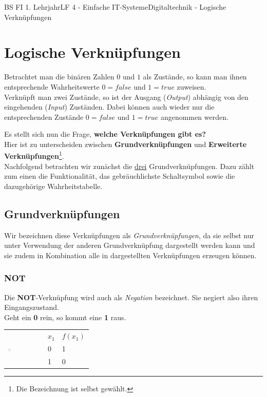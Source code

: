 \documentclass[11pt,twocolumn,oneside,openany,headings=optiontotoc,11pt,numbers=noenddot]{article}
\begin{document}
	\begin{worksheet}{BS FI 1. Lehrjahr}{LF 4 - Einfache IT-Systeme}{Digitaltechnik - Logische Verknüpfungen}
		\setcounter{section}{1}
		\setcounter{page}{5}
		\section{Logische Verknüpfungen}
		Betrachtet man die binären Zahlen \(0\) und \(1\) als Zustände, so kann man ihnen entsprechende Wahrheitswerte \(0 = false\) und \(1 = true\) zuweisen.\\
		Verknüpft man zwei Zustände, so ist der Ausgang (\textit{Output}) abhängig von den eingehenden (\textit{Input}) Zuständen. Dabei können auch wieder nur die entsprechenden Zustände \(0 = false\) und \(1 = true\) angenommen werden.\\
		\par\noindent
		Es stellt sich nun die Frage, \textbf{welche Verknüpfungen gibt es?}\\
		Hier ist zu unterscheiden zwischen \textbf{Grundverknüpfungen} und \textbf{Erweiterte Verknüpfungen}\footnote{Die Bezeichnung ist selbst gewählt.}.\\
		Nachfolgend betrachten wir zunächst die \underline{drei} Grundverknüpfungen. Dazu zählt zum einen die Funktionalität, das gebräuchlichste Schaltsymbol sowie die dazugehörige Wahrheitstabelle.
		\subsection{Grundverknüpfungen}
		Wir bezeichnen diese Verknüpfungen als \textit{Grundverknüpfungen}, da sie selbst nur unter Verwendung der anderen Grundverknüpfung dargestellt werden kann und sie zudem in Kombination alle in \textit{} dargestellten Verknüpfungen erzeugen können.
		\subsubsection*{NOT}
		Die \textbf{NOT}-Verknüpfung wird auch als \textit{Negation} bezeichnet. Sie negiert also ihren Eingangszustand.\\
		Geht ein \textbf{0} rein, so kommt eine \textbf{1} raus.
		\par\noindent
		\begin{tabularx}{0.48\textwidth}{ll|l}
			\multirow{3}{*}{\includegraphics[width=0.1\textwidth,align=t]{../99_Bilder/NOT.jpg}} & \(x_1\) & \(f(x_1)\)\\
			\cline{2-3}
			 & 0 & 1\\
			& 1 & 0\\
		\end{tabularx}

\end{worksheet}
\end{document}
